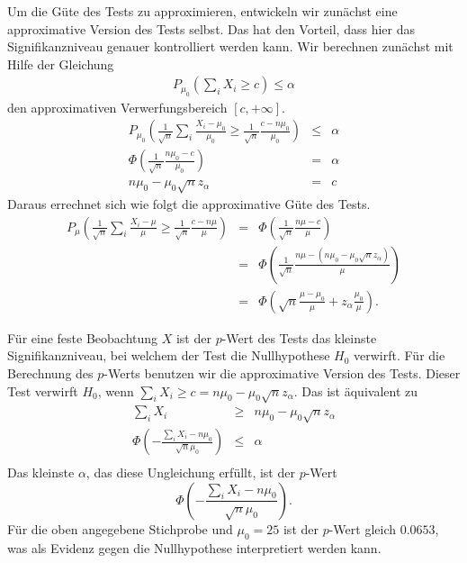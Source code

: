 Um die Güte des Tests zu approximieren, entwickeln wir zunächst eine approximative 
Version des Tests selbst. Das hat den Vorteil, dass hier das Signifikanzniveau 
genauer kontrolliert werden kann. Wir berechnen zunächst mit Hilfe der Gleichung
\begin{eqnarray}
    P_{\mu_0} \left( \sum_{i}^{} X_i \geq c \right) \leq \alpha
\end{eqnarray}
den approximativen Verwerfungsbereich $\left[ c,+\infty \right]$.
\begin{eqnarray}
    P_{\mu_0} \left( \frac{1}{\sqrt{n}} \sum_{i}^{} \frac{X_i - \mu_0}{\mu_0} \geq \frac{1}{\sqrt{n}} 
    \frac{c -n\mu_0}{ \mu_0}\right) &\leq& \alpha \\
    \Phi \left( \frac{1}{\sqrt{n} } \frac{n \mu_0 - c}{\mu_0}  \right) &=&  \alpha \\
    n \mu_0 - \mu_0 \sqrt{n} z_\alpha &=&  c
\end{eqnarray}
Daraus errechnet sich wie folgt die approximative Güte des Tests.
\begin{eqnarray}
    P_\mu \left( \frac{1}{\sqrt{n}} \sum_{i}^{} \frac{X_i - \mu}{\mu} \geq \frac{1}{\sqrt{n}} \frac{c-n \mu}{ \mu}   \right) &=&  \Phi \left( \frac{1}{\sqrt{n}} \frac{n \mu - c}{ \mu} \right) \\
    &=& \Phi \left( \frac{1}{\sqrt{n}} \frac{n \mu - \left( n \mu_0 -\mu_0 \sqrt{n} z_\alpha \right)}{\mu} \right) \\
    &=& \Phi \left( \sqrt{n} \frac{\mu - \mu_0}{\mu} + z_\alpha \frac{\mu_0}{\mu} \right).
\end{eqnarray}

Für eine feste Beobachtung $X$ ist der $p$-Wert des Tests das kleinste Signifikanzniveau, 
bei welchem der Test die Nullhypothese $H_0$ verwirft. Für die Berechnung des $p$-Werts
benutzen wir die approximative Version des Tests. Dieser Test verwirft $H_0$, wenn
$\sum_{i}^{} X_i \geq c = n \mu_0 - \mu_0 \sqrt{n} z_\alpha$. Das ist äquivalent zu
\begin{eqnarray}
    \sum_{i}^{} X_i &\geq & n \mu_0 - \mu_0 \sqrt{n} z_\alpha \\ 
    \Phi \left(  - \frac{ \sum_{i}^{} X_i -n \mu_0   }{\sqrt{n} \mu_0} \right) &\leq& \alpha \\
\end{eqnarray}
Das kleinste $\alpha$, das diese Ungleichung erfüllt, ist der $p$-Wert
\begin{equation}
    \Phi \left(  - \frac{ \sum_{i}^{} X_i -n \mu_0   }{\sqrt{n} \mu_0} \right).
\end{equation}
Für die oben angegebene Stichprobe und $\mu_0=25$ ist der $p$-Wert gleich $0.0653$, was als
Evidenz gegen die Nullhypothese interpretiert werden kann.

